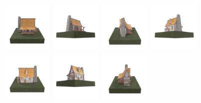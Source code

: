 \begin{figure}[htbp]
  \centering
  \includegraphics[width=0.22\textwidth]{images/data/samples/obj2/000.jpeg}\hfill
  \includegraphics[width=0.22\textwidth]{images/data/samples/obj2/001.jpeg}\hfill
  \includegraphics[width=0.22\textwidth]{images/data/samples/obj2/002.jpeg}\hfill
  \includegraphics[width=0.22\textwidth]{images/data/samples/obj2/003.jpeg}\\
  \includegraphics[width=0.22\textwidth]{images/data/samples/obj2/004.jpeg}\hfill
  \includegraphics[width=0.22\textwidth]{images/data/samples/obj2/005.jpeg}\hfill
  \includegraphics[width=0.22\textwidth]{images/data/samples/obj2/006.jpeg}\hfill

\end{figure}
